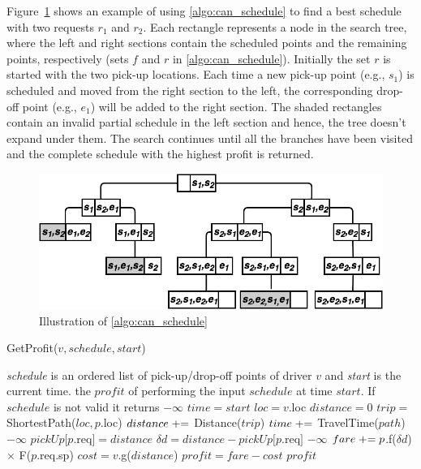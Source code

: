 Figure~\ref{fig:bAndb} shows an example of using \cref{algo:can_schedule} to find a best schedule with two requests $r_1$ and $r_2$. Each rectangle represents a node in the search tree, where the left and right sections contain the scheduled points and the remaining points, respectively (sets $f$ and $r$ in \cref{algo:can_schedule}). Initially the set $r$ is started with the two pick-up locations. Each time a new pick-up point (e.g., $s_1$) is scheduled and moved from the right section to the left, the corresponding drop-off point (e.g., $e_1$) will be added to the right section. The shaded rectangles contain an invalid partial schedule in the left section and hence, the tree doesn't expand under them. The search continues until all the branches have been visited and the complete schedule with the highest profit is returned.

\begin{figure}[!ht]
	\centering
	\includegraphics[width=0.75\columnwidth]{fig/bAndb.png}
	\vspace{-0mm}\caption{Illustration of \cref{algo:can_schedule}} \vspace{-2mm} \label{fig:bAndb}
\end{figure}\vspace{-0mm}

\begin{algorithm}
	\caption{GetProfit($v, schedule, start$)}
	\label{algo:get_profit}
	\begin{algorithmic}[1]
		\REQUIRE \emph{schedule} is an ordered list of pick-up/drop-off points of driver $v$ and \emph{start} is the current time.
		\ENSURE the $profit$ of performing the input $schedule$ at time $start$. If $schedule$ is not valid it returns $-\infty$
		\STATE $time = start$
		\STATE $loc = v.$loc\label{ln:loc}
		\STATE $distance = 0$
		\STATE $trip =$ ShortestPath($loc, p$.loc)
		\STATE $distance \mathrel{+}=$ Distance($trip$)
		\STATE $time \mathrel{+}=$ TravelTime($path$)
		\label{ln:mwt}
		\RETURN $-\infty$
		\ENDIF
		\STATE $pickUp[p$.req$]=distance$
		\ENDIF
		\STATE $\delta d = distance - pickUp[p$.req$]$
		\label{ln:mad}
		\RETURN $-\infty$
		\ENDIF
		\STATE $fare \mathrel{+}= p$.f($\delta d$) $\times$ F($p$.req.sp)\label{ln:delta}
		\STATE $cost = v$.g($distance$)\label{ln:dprof}
		\ENDIF
		\ENDFOR
		\STATE $profit = fare - cost$
		\RETURN $profit$
	\end{algorithmic} 
\end{algorithm}

